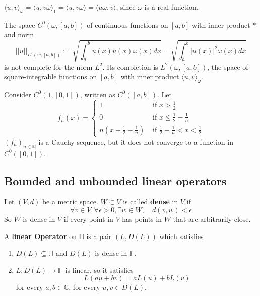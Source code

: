 \begin{remark}
	${\langle u, v \rangle}_{\omega} = {\langle u, v \omega \rangle}_1 = \langle u, v \omega \rangle = \langle u \omega, v \rangle$, since $\omega$ is a real function.
\end{remark}

\begin{example}
	The space $C^0 (\omega, [a, b])$ of continuous functions on $[a, b]$ with inner product $*$ and norm
	\[
		||u||_{L^2 (w, [a, b])} := \sqrt{\int_{a}^{b} \bar{u}(x) u(x) \omega(x) dx} = \sqrt{\int_{a}^{b} |u(x)|^2 \omega(x) dx}
	\]
	is not complete for the norm $L^2$. Its completion is $L^2 (\omega, [a, b])$, the space of square-integrable functions on $[a, b]$ with inner product ${\langle u, v \rangle}_{\omega}$.
\end{example}

\begin{example}
	Consider $C^0(1, [0, 1])$, written as $C^0 ([a, b])$. Let
	\[
		f_n(x) = \begin{cases}
			1 & \text{ if } x > \frac{1}{2} \\
			0 & \text{ if } x \le \frac{1}{2} - \frac{1}{n} \\
			n(x - \frac{1}{2} - \frac{1}{n}) & \text{ if } \frac{1}{2} - \frac{1}{n} < x < \frac{1}{2}
		\end{cases}
	\]
	${(f_n)}_{n \in \mathbb{N}}$ is a Cauchy sequence, but it does not converge to a function in $C^0([0, 1])$.
\end{example}

\subsection{Bounded and unbounded linear operators}

\begin{definition}
	Let $(V, d)$ be a metric space. $W \subset V$ is called \textbf{dense} in $V$ if
	\[
		\forall v \in V, \forall \epsilon > 0, \exists w \in W, \quad d(v, w) < \epsilon
	\]
	So $W$ is dense in $V$ if every point in $V$ has points in $W$ that are arbitrarily close.
\end{definition}

\begin{definition}
	A \textbf{linear Operator} on $\mathbb{H}$ is a pair $(L, D(L))$ which satisfies
	\begin{enumerate}
		\item $D(L) \subseteq \mathbb{H}$ and $D(L)$ is dense in $\mathbb{H}$.
		\item $L: D(L) \rightarrow \mathbb{H}$ is linear, so it satisfies
		\[
			L(a u + b v) = a L(u) + b L(v)
		\]
		for every $a, b \in \mathbb{C}$, for every $u, v \in D(L)$.
	\end{enumerate}
\end{definition}

